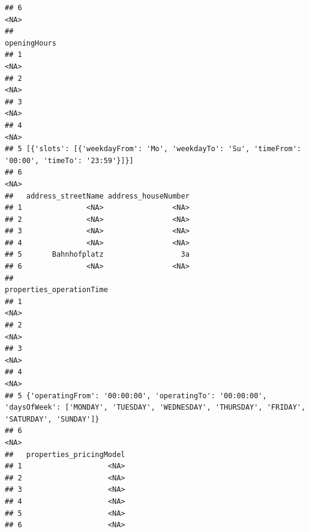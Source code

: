 \documentclass[
]{book}
\begin{document}
\begin{verbatim}
## 6                                                                                                                                                                                                                                                                                                                                                                                                                                                                                                                                                                                                                                                                                                                                          <NA>
##                                                                                      openingHours
## 1                                                                                            <NA>
## 2                                                                                            <NA>
## 3                                                                                            <NA>
## 4                                                                                            <NA>
## 5 [{'slots': [{'weekdayFrom': 'Mo', 'weekdayTo': 'Su', 'timeFrom': '00:00', 'timeTo': '23:59'}]}]
## 6                                                                                            <NA>
##   address_streetName address_houseNumber
## 1               <NA>                <NA>
## 2               <NA>                <NA>
## 3               <NA>                <NA>
## 4               <NA>                <NA>
## 5       Bahnhofplatz                  3a
## 6               <NA>                <NA>
##                                                                                                                                 properties_operationTime
## 1                                                                                                                                                   <NA>
## 2                                                                                                                                                   <NA>
## 3                                                                                                                                                   <NA>
## 4                                                                                                                                                   <NA>
## 5 {'operatingFrom': '00:00:00', 'operatingTo': '00:00:00', 'daysOfWeek': ['MONDAY', 'TUESDAY', 'WEDNESDAY', 'THURSDAY', 'FRIDAY', 'SATURDAY', 'SUNDAY']}
## 6                                                                                                                                                   <NA>
##   properties_pricingModel
## 1                    <NA>
## 2                    <NA>
## 3                    <NA>
## 4                    <NA>
## 5                    <NA>
## 6                    <NA>
\end{verbatim}
\end{document}
